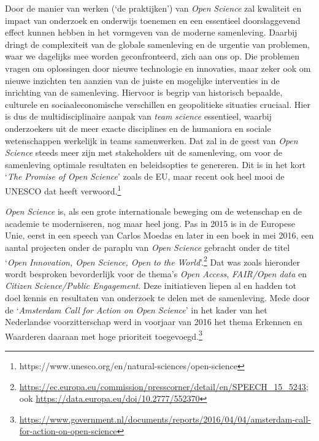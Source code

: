 \documentclass[smallauthor, chapterhaspagenum, nochapterinheader, pagenuminheader,  bigchapnum,medium2, tocpages, garamond, titleinheader]{jote-book}
\begin{document}
	Door de manier van werken (‘de praktijken') van \emph{Open }\emph{Science} zal kwaliteit en impact van onderzoek en onderwijs toenemen en een essentieel doorslaggevend effect kunnen hebben in het vormgeven van de moderne samenleving. Daarbij dringt de complexiteit van de globale samenleving en de urgentie van problemen, waar we dagelijks mee worden geconfronteerd, zich aan ons op. Die problemen vragen om oplossingen door nieuwe technologie en innovaties, maar zeker ook om nieuwe inzichten ten aanzien van de juiste en mogelijke interventies in de inrichting van de samenleving. Hiervoor is begrip van historisch bepaalde, culturele en sociaaleconomische verschillen en geopolitieke situaties cruciaal. Hier is dus de multidisciplinaire aanpak van \emph{team }\emph{science} essentieel, waarbij onderzoekers uit de meer exacte disciplines en de humaniora en sociale wetenschappen werkelijk in teams samenwerken. Dat zal in de geest van \emph{Open }\emph{Science} steeds meer zijn met stakeholders uit de samenleving, om voor de samenleving optimale resultaten en beleidsopties te genereren. Dit is in het kort ‘\emph{The }\emph{Promise}\emph{ of }\emph{Open }\emph{Science}' zoals de EU, maar recent ook heel mooi de UNESCO dat heeft verwoord.\footnote{https://www.unesco.org/en/natural-sciences/open-science}



	\emph{Open }\emph{Science} is, als een grote internationale beweging om de wetenschap en de academie te moderniseren, nog maar heel jong. Pas in 2015 is in de Europese Unie, eerst in een speech van Carlos Moedas en later in een boek in mei 2016, een aantal projecten onder de paraplu van \emph{Open }\emph{Science} gebracht onder de titel ‘\emph{Open }\emph{Innovation}\emph{, Open }\emph{Science}\emph{, Open }\emph{to}\emph{ }\emph{the}\emph{ World}'.\footnote{\href{https://ec.europa.eu/commission/presscorner/detail/en/SPEECH_15_5243}{https://ec.europa.eu/commission/presscorner/detail/en/SPEECH\_15\_5243}; ook \href{https://data.europa.eu/doi/10.2777/552370}{https://data.europa.eu/doi/10.2777/552370}} Dat was zoals hieronder wordt besproken bevorderlijk voor de thema's \emph{Open Access}, \emph{FAIR/Open data} en \emph{Citizen}\emph{ }\emph{Science}\emph{/Public Engagement}. Deze initiatieven liepen al en hadden tot doel kennis en resultaten van onderzoek te delen met de samenleving. Mede door de ‘\emph{Amsterdam Call }\emph{for}\emph{ Action on }\emph{Open }\emph{Science}' in het kader van het Nederlandse voorzitterschap werd in voorjaar van 2016 het thema Erkennen en Waarderen daaraan met hoge prioriteit toegevoegd.\footnote{\href{https://www.government.nl/documents/reports/2016/04/04/amsterdam-call-for-action-on-open-science}{https://www.government.nl/documents/reports/2016/04/04/amsterdam-call-for-action-on-open-science}}
\end{document}
